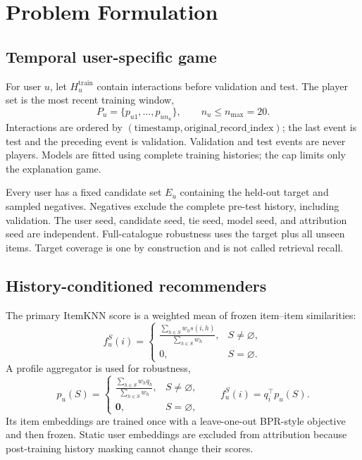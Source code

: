 \documentclass[pdflatex,sn-basic,Numbered]{sn-jnl}
\begin{document}
\section{Problem Formulation}
\subsection{Temporal user-specific game}
For user $u$, let $H_u^{\mathrm{train}}$ contain interactions before validation and test. The player set is the most recent training window,
\begin{equation}
P_u=\{p_{u1},\ldots,p_{un_u}\},\qquad n_u\le n_{\max}=20.
\end{equation}
Interactions are ordered by $(\mathrm{timestamp},\mathrm{original\_record\_index})$; the last event is test and the preceding event is validation. Validation and test events are never players. Models are fitted using complete training histories; the cap limits only the explanation game.

Every user has a fixed candidate set $E_u$ containing the held-out target and sampled negatives. Negatives exclude the complete pre-test history, including validation. The user seed, candidate seed, tie seed, model seed, and attribution seed are independent. Full-catalogue robustness uses the target plus all unseen items. Target coverage is one by construction and is not called retrieval recall.

\subsection{History-conditioned recommenders}
The primary ItemKNN score is a weighted mean of frozen item--item similarities:
\begin{equation}
f_u^S(i)=
\begin{cases}
\displaystyle\frac{\sum_{h\in S}w_hs(i,h)}{\sum_{h\in S}w_h},&S\ne\varnothing,\\[6pt]
0,&S=\varnothing.
\end{cases}
\end{equation}
A profile aggregator is used for robustness,
\begin{equation}
p_u(S)=
\begin{cases}
\displaystyle\frac{\sum_{h\in S}w_hq_h}{\sum_{h\in S}w_h},&S\ne\varnothing,\\[6pt]
\mathbf 0,&S=\varnothing,
\end{cases}
\qquad f_u^S(i)=q_i^\top p_u(S).
\end{equation}
Its item embeddings are trained once with a leave-one-out BPR-style objective and then frozen. Static user embeddings are excluded from attribution because post-training history masking cannot change their scores.
\end{document}
